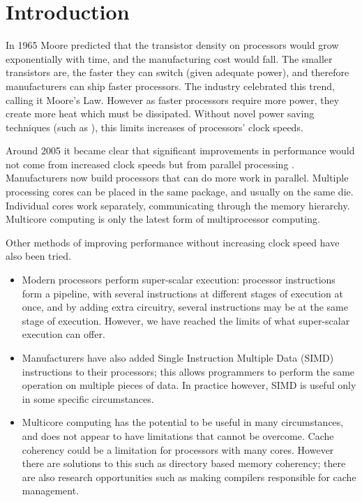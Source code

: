 %
%
\chapter{Introduction}
\setcounter{page}{1}
\label{chap:intro}


In 1965 Moore \citep{moore} predicted that the transistor 
density on processors would grow exponentially with time,
and the manufacturing cost would fall.
The smaller transistors are, the faster they can switch
(given adequate power),
and therefore manufacturers can ship faster processors.
The industry celebrated this trend,
calling it Moore's Law.
However as faster processors require more power,
they create more heat which must be dissipated.
Without novel power saving techniques
(such as \citet{intel-high-k}),
this limits increases of processors' clock speeds.

Around 2005 it became clear that significant improvements in performance
would not come from increased clock speeds but from parallel processing
\citep{free_lunch}.
Manufacturers now build processors that can do more work in parallel.
Multiple processing cores can be placed in the same package,
and usually on the same die.
Individual cores work separately, communicating through the memory
hierarchy.
Multicore computing is only the latest form of multiprocessor computing.

Other methods of improving performance without increasing clock speed have
also been tried.

\begin{itemize}

\item
Modern processors perform super-scalar execution:
processor instructions form a pipeline,
with several instructions at different stages of execution at once,
and by adding extra circuitry, several instructions may be at the same stage
of execution.
However, we have reached the limits of what super-scalar execution can
offer.

\item
Manufacturers have also added Single Instruction Multiple Data (SIMD)
instructions to their processors;
this allows programmers to perform the same operation on multiple pieces of
data.
In practice however, SIMD is useful only in some specific circumstances.

\item
Multicore computing has the potential to be useful in many circumstances,
and does not appear to have limitations that cannot be overcome.
Cache coherency could be a limitation for processors with many cores.
However there are solutions to this such as directory based memory
coherency;
there are also research opportunities such as making compilers responsible
for cache management.

\end{itemize}

